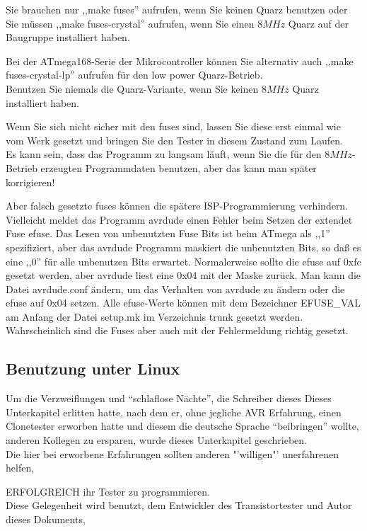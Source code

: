 Sie brauchen nur ,,make fuses'' aufrufen, wenn Sie keinen Quarz benutzen oder Sie
müssen ,,make fuses-crystal'' aufrufen, wenn Sie einen \(8MHz\) Quarz auf der Baugruppe installiert haben.

Bei der ATmega168-Serie der Mikrocontroller können Sie alternativ auch
,,make fuses-crystal-lp'' aufrufen für den low power Quarz-Betrieb.\\
Benutzen Sie niemals die Quarz-Variante, wenn Sie keinen \(8MHz\) Quarz installiert haben.

Wenn Sie sich nicht sicher mit den fuses sind, lassen Sie diese erst einmal wie
vom Werk gesetzt und bringen Sie den Tester in diesem Zustand zum Laufen.\\
Es kann sein, dass das Programm zu langsam läuft, wenn Sie die für den \(8MHz\)-Betrieb 
erzeugten Programmdaten benutzen, aber das kann man später korrigieren!

Aber falsch gesetzte fuses können die spätere ISP-Programmierung verhindern.
\\Vielleicht meldet das Programm avrdude einen Fehler beim Setzen der extendet Fuse efuse.
Das Lesen von unbenutzten Fuse Bits ist beim ATmega als ,,1'' spezifiziert, aber
das avrdude Programm maskiert die unbenutzten Bits, so daß es eine ,,0'' für alle unbenutzen Bits erwartet.
Normalerweise sollte die efuse auf 0xfc gesetzt werden, aber avrdude liest eine 0x04 mit der Maske zurück.
Man kann die Datei avrdude.conf ändern, um das Verhalten von avrdude zu ändern oder
die efuse auf 0x04 setzen. 
Alle efuse-Werte können mit dem Bezeichner EFUSE\_VAL am Anfang der Datei setup.mk im Verzeichnis trunk
gesetzt werden. Wahrscheinlich sind die Fuses aber auch mit der Fehlermeldung richtig gesetzt.
\newpage
\subsection{Benutzung unter Linux}

Um die Verzweiflungen und "`schlaflose Nächte"', die Schreiber dieses Dieses Unterkapitel erlitten hatte, nach dem er, ohne jegliche AVR Erfahrung, einen Clonetester erworben hatte und diesem die deutsche Sprache "`beibringen"' wollte, anderen Kollegen zu ersparen, wurde dieses Unterkapitel geschrieben.\\
Die hier bei erworbene Erfahrungen sollten anderen "'willigen"' unerfahrenen helfen,
 
ERFOLGREICH ihr Tester zu programmieren.\\
Diese Gelegenheit wird benutzt, dem Entwickler des Transistortester und Autor dieses Dokuments,  

